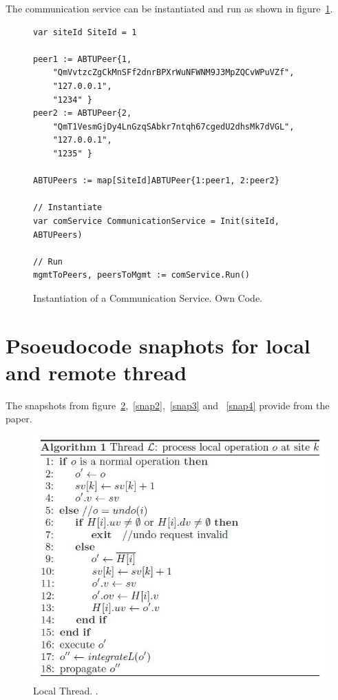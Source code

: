 \documentclass[11pt, a4paper, oneside, openright]{article} %
\begin{document}
The communication service can be instantiated and run as shown in figure~\ref{code:installcom}.

\begin{figure}[!h]
\begin{center}
\begin{lstlisting}
var siteId SiteId = 1

peer1 := ABTUPeer{1,
	"QmVvtzcZgCkMnSFf2dnrBPXrWuNFWNM9J3MpZQCvWPuVZf",
	"127.0.0.1",
	"1234" }
peer2 := ABTUPeer{2,
	"QmT1VesmGjDy4LnGzqSAbkr7ntqh67cgedU2dhsMk7dVGL",
	"127.0.0.1",
	"1235" }

ABTUPeers := map[SiteId]ABTUPeer{1:peer1, 2:peer2}

// Instantiate
var comService CommunicationService = Init(siteId, ABTUPeers)

// Run
mgmtToPeers, peersToMgmt := comService.Run()

\end{lstlisting}
\end{center}
\caption{Instantiation of a Communication Service. Own Code.\label{code:installcom}}
\end{figure}

\section{Psoeudocode snaphots for local and remote thread}
The snapshots from figure~\ref{snap1},~\ref{snap2},~\ref{snap3} and ~\ref{snap4} provide from the \cite{abtuu} paper.

\begin{figure}[!h]
\begin{center}
\includegraphics[scale=0.5]{snapshots/localThread.jpg}
\end{center}
\caption{Local Thread. \cite{abtuu}.\label{snap1}}
\end{figure}
\end{document}
